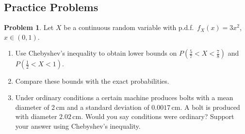 \documentclass[12pt,a4paper]{report}
\theoremstyle{definition}
\theoremstyle{plain}
\theoremstyle{definition}
\newtheorem{problemx}{Problem}[section]
\newenvironment{problem}{\begin{problemx}}{\end{problemx}}
\begin{document}
\subsection{Practice Problems}

\begin{problem}
Let $X$ be a continuous random variable with p.d.f.\ $f_X(x) = 3x^{2}$, $x\in(0,1)$.
\begin{enumerate}
\item[(a).] Use Chebyshev's inequality to obtain lower bounds on
$P\left(\frac{5}{7}<X<\frac{7}{8}\right)$ and $P\left(\frac{1}{2}<X<1\right)$.
\item[(b).] Compare these bounds with the exact probabilities.
\item[(c).] Under ordinary conditions a certain machine produces bolts with a mean
diameter of 2\,cm and a standard deviation of $0.0017$\,cm. A bolt is produced with
diameter $2.02$\,cm. Would you say conditions were ordinary? Support your answer using
Chebyshev's inequality.
\end{enumerate}
\end{problem}
\end{document}
